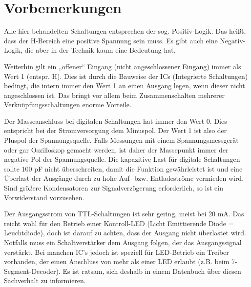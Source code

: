 \chapter{Vorbemerkungen}

Alle hier behandelten Schaltungen entsprechen der sog. Positiv-Logik. Das heißt, dass der H-Bereich eine positive Spannung sein muss. Es gibt auch eine Negativ-Logik, die aber in der Technik kaum eine Bedeutung hat.

Weiterhin gilt ein „offener“ Eingang (nicht angeschlossener Eingang) immer als Wert 1 (entspr. H). Dies ist durch die Bauweise der ICs (Integrierte Schaltungen) bedingt, die intern immer den Wert 1 an einen Ausgang legen, wenn dieser nicht angeschlossen ist. Das bringt vor allem beim Zusammenschalten mehrerer Verknüpfungsschaltungen enorme Vorteile.

Der Masseanschluss bei digitalen Schaltungen hat immer den Wert 0. Dies entspricht bei der Stromversorgung dem Minuspol. Der Wert 1 ist also der Pluspol der Spannungsquelle. Falls Messungen mit einem Spannungsmessgerät oder gar Oszilloskop gemacht werden, ist daher der Massepunkt immer der negative Pol der Spannungsquelle. Die kapazitive Last für digitale Schaltungen sollte 100 pF nicht überschreiten, damit die Funktion gewährleistet ist und eine Überlast der Ausgänge durch zu hohe Auf- bzw. Entladeströme vermieden wird. Sind größere Kondensatoren zur Signalverzögerung erforderlich, so ist ein Vorwiderstand vorzusehen.

Der Ausgangsstrom von TTL-Schaltungen ist sehr gering, meist bei 20 mA. Das reicht wohl für den Betrieb einer Kontroll-LED (Licht Emittierende Diode = Leuchtdiode), doch ist darauf zu achten, dass der Ausgang nicht überlastet wird. Notfalls muss ein Schaltverstärker dem Ausgang folgen, der das Ausgangssignal verstärkt. Bei manchen IC’s jedoch ist speziell für LED-Betrieb ein Treiber vorhanden, der einen Anschluss von mehr als einer LED erlaubt (z.B. beim 7-Segment-Decoder). Es ist ratsam, sich deshalb in einem Datenbuch über diesen Sachverhalt zu informieren.

